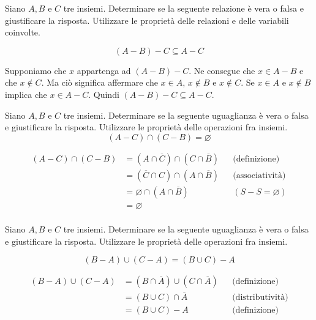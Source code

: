 
\begin{esercizio}
Siano $A,B$ e $C$ tre insiemi. Determinare se la seguente relazione è vera o falsa e giustificare la risposta. Utilizzare le proprietà  delle relazioni e delle variabili coinvolte.

    $$(A-B) - C \subseteq A - C$$
\end{esercizio}

\begin{soluzione}
Supponiamo che $x$ appartenga ad $(A-B) - C$. Ne consegue che  $x \in A - B$ e che $x \not\in C$. Ma ciò significa affermare che $x \in A$, $x \not\in B$ e $x \not\in C$. Se $x \in A$ e $x \not\in B$ implica che $x \in A-C$. Quindi $(A-B) - C \subseteq A - C$. \\
\end{soluzione}


\begin{esercizio}
Siano $A,B$ e $C$ tre insiemi. Determinare se la seguente uguaglianza è vera o falsa e giustificare la risposta. Utilizzare le proprietà delle operazioni fra insiemi.
    $$(A-C) \cap (C-B) = \varnothing$$
\end{esercizio}

\begin{soluzione}
\begin{align*}
    (A-C) \cap (C-B) & = (A \cap \overline{C}) \cap (C \cap \overline{B})  && \text{(definizione)}\\
    & = (\overline{C} \cap C) \cap (A \cap \overline{B})  && \text{(associatività)}\\
    & = \varnothing \cap (A \cap \overline{B})  && (S-S = \varnothing)\\
    & = \varnothing  \\
\end{align*}
\end{soluzione}


\begin{esercizio}
Siano $A,B$ e $C$ tre insiemi. Determinare se la seguente uguaglianza è vera o falsa e giustificare la risposta. Utilizzare le proprietà delle operazioni fra insiemi.

    $$(B-A) \cup (C-A) = (B \cup C) - A$$
\end{esercizio}

\begin{soluzione}
\begin{align*}
    (B-A) \cup (C-A) & = (B \cap \overline{A}) \cup (C \cap \overline{A}) &&\text{(definizione)}\\
    & = (B \cup C) \cap \overline{A} &&\text{(distributività)}\\
    & = (B \cup C)  - A &&\text{(definizione)}
\end{align*}
\end{soluzione}